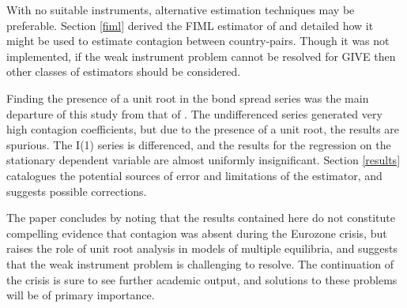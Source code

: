 \documentclass[/../base.tex]{subfiles}
\begin{document}
With no suitable instruments, alternative estimation techniques may be preferable. Section \ref{fiml} derived the FIML estimator of \cite{massacci2007identification} and detailed how it might be used to estimate contagion between country-pairs. Though it was not implemented, if the weak instrument problem cannot be resolved for GIVE then other classes of estimators should be considered. 

Finding the presence of a unit root in the bond spread series was the main departure of this study from that of \cite{metiu2012sovereign}. The undifferenced series generated very high contagion coefficients, but due to the presence of a unit root, the results are spurious. The I(1) series is differenced, and the results for the regression on the stationary dependent variable are almost uniformly insignificant. Section \ref{results} catalogues the potential sources of error and limitations of the estimator, and suggests possible corrections.

The paper concludes by noting that the results contained here do not constitute compelling evidence that contagion was absent during the Eurozone crisis, but raises the role of unit root analysis in models of multiple equilibria, and suggests that the weak instrument problem is challenging to resolve. The continuation of the crisis is sure to see further academic output, and solutions to these problems will be of primary importance. 
\end{document}
